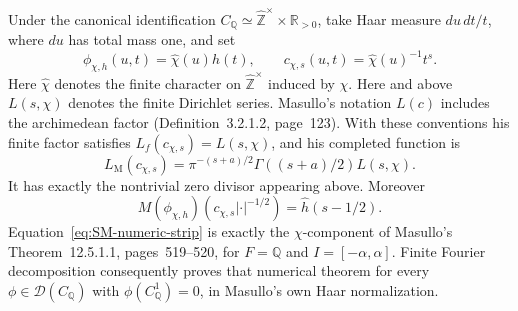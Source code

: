 Under the canonical identification
$C_{\mathbb Q}\simeq\widehat{\mathbb Z}^{\times}\times\mathbb R_{>0}$,
take Haar measure $du\,dt/t$, where $du$ has total mass one, and set
\[
 \phi_{\chi,h}(u,t)=\widehat\chi(u)h(t),\qquad
 c_{\chi,s}(u,t)=\widehat\chi(u)^{-1}t^s.
\]
Here $\widehat\chi$ denotes the finite character on
$\widehat{\mathbb Z}^{\times}$ induced by $\chi$.
Here and above $L(s,\chi)$ denotes the finite Dirichlet series.  Masullo's
notation $L(c)$ includes the archimedean factor (Definition~3.2.1.2,
page~123).  With these conventions his finite factor satisfies
$L_f(c_{\chi,s})=L(s,\chi)$, and his completed function is
\[
 L_{\mathrm M}(c_{\chi,s})=
 \pi^{-(s+a)/2}\Gamma((s+a)/2)L(s,\chi).
\]
It has exactly the nontrivial zero divisor appearing above.  Moreover
\[
 M(\phi_{\chi,h})(c_{\chi,s}|\cdot|^{-1/2})
       =\widehat h(s-1/2).
\]
Equation~\eqref{eq:SM-numeric-strip} is exactly the $\chi$-component of
Masullo's Theorem~12.5.1.1, pages~519--520, for $F=\mathbb Q$ and
$I=[-\alpha,\alpha]$.  Finite Fourier decomposition consequently proves
that numerical theorem for every $\phi\in\mathcal D(C_{\mathbb Q})$
with $\phi(C_{\mathbb Q}^1)=0$, in Masullo's own Haar normalization.

